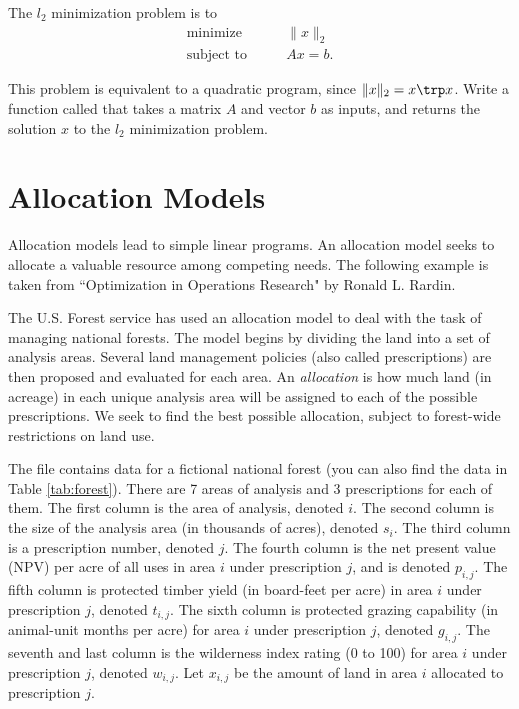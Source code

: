 \begin{problem}
The $l_2$ minimization problem is to
\begin{align*}
\text{minimize}\qquad &\|x\|_2\\
\text{subject to} \qquad &Ax = b.
\end{align*}

This problem is equivalent to a quadratic program, since $\|x\|_2 = x\trp x$.
Write a function called  that takes a matrix $A$ and vector $b$ as inputs, and returns the solution $x$ to the $l_2$ minimization problem.
\end{problem}

\section*{Allocation Models}
Allocation models lead to simple linear programs. An allocation model seeks to allocate a valuable resource among competing needs. The following example is taken from ``Optimization in Operations Research" by Ronald L. Rardin. %

The U.S. Forest service has used an allocation model to deal with the task of managing national forests. 
The model begins by dividing the land into a set of analysis areas. Several land management policies (also 
called prescriptions) are then proposed and evaluated for each area. 
An \emph{allocation} is how much land (in acreage) in each unique analysis area will be assigned to each of the possible prescriptions.
We seek to find the best possible allocation, subject to forest-wide restrictions on land use.

The file  contains data for a fictional national forest (you can also find the data
in Table \ref{tab:forest}). There are 7 areas of analysis and 3 prescriptions for each of them. 
The first column is the area of analysis, denoted $i$. The second column is the size of the analysis area (in thousands of acres), denoted $s_i$. The third column is a prescription number, denoted $j$. The fourth column is the net present value (NPV) per acre of all uses in area $i$ under prescription $j$, and is denoted $p_{i,j}$. The fifth column is protected timber yield (in board-feet per acre) in area $i$ under prescription $j$, denoted $t_{i,j}$. The sixth column is protected grazing capability (in animal-unit months per acre) for area $i$ under prescription $j$, denoted
$g_{i,j}$. The seventh and last column is the wilderness index rating (0 to 100) for area $i$ under prescription $j$, denoted $w_{i,j}$. Let $x_{i,j}$ be the amount of land in area $i$ allocated to prescription $j$.

